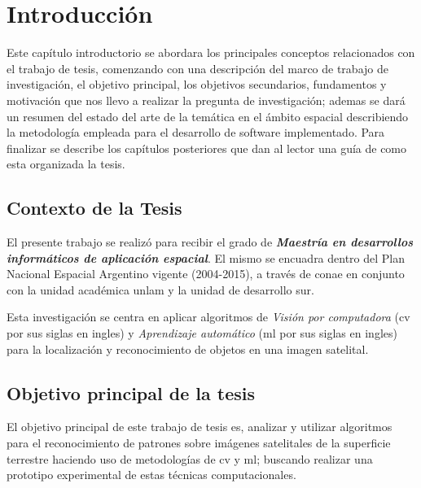 \chapter{Introducción}\label{chap:introduccion}

Este capítulo introductorio se abordara los principales conceptos relacionados con el trabajo de tesis, comenzando con una descripción del marco de trabajo de investigación, el objetivo principal, los objetivos secundarios, fundamentos y motivación que nos llevo a realizar la pregunta de investigación; ademas se dará un resumen del estado del arte de la temática en el ámbito espacial describiendo la metodología empleada para el desarrollo de software implementado.  Para finalizar se describe los capítulos posteriores que dan al lector una guía de como esta organizada la tesis.


\section{Contexto de la Tesis}\label{sec:contexto}
El presente trabajo se realizó para recibir el grado de \textbf{\textit{Maestría en desarrollos informáticos de aplicación espacial}}. El mismo se encuadra dentro del Plan Nacional Espacial Argentino vigente (2004-2015), a través de \ac{conae} en conjunto con la unidad académica \ac{unlam} y la unidad de desarrollo \ac{sur}.

Esta investigación se centra en aplicar  algoritmos de \textit{Visión por computadora} (\ac{cv} por sus siglas en ingles)  y \textit{Aprendizaje automático} (\ac{ml} por sus siglas en ingles) para la localización y reconocimiento de objetos en una imagen satelital.


\section{Objetivo principal de la tesis}\label{sec:obj_general}

El objetivo principal de este trabajo de tesis es, analizar y utilizar algoritmos para el  reconocimiento de patrones sobre imágenes satelitales de la superficie terrestre haciendo uso de metodologías de \ac{cv} y \ac{ml}; buscando realizar una prototipo experimental de estas técnicas computacionales.


